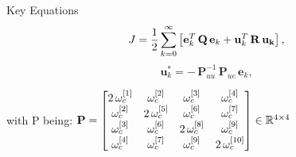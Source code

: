 \documentclass{beamer}
\begin{document}
\begin{frame}{Key Equations}
\begin{equation}
  J =  \frac{1}{2} \sum_{k=0}^\infty\left[{\bf e}_k^T \, {\bf Q} \, {\bf e}_k + {\bf u}_k^T \, {\bf R} \, {\bf u_k}\right],
\end{equation}
\begin{equation}
 \mathbf{u}_k^* = -\,  \mathbf{P}_{uu}^{-1}\, \mathbf{P}_{ue}\, \mathbf{e}_k,
\end{equation}
\begin{center}
with P being:
 ${\bf P}=\begin{bmatrix} 
 2\,\omega_c^{[1]}    & \omega_c^{[2]}      & \omega_c^{[3]}       & \omega_c^{[4]}        \\ 
 \omega_c^{[2]}       &2\, \omega_c^{[5]}   & \omega_c^{[6]}       & \omega_c^{[7]}        \\
 \omega_c^{[3]}       & \omega_c^{[6]}      &2\, \omega_c^{[8]}   & \omega_c^{[9]}   \\   
 \omega_c^{[4]}       & \omega_c^{[7]}      & \omega_c^{[9]}      & 2\,\omega_c^{[10]}      
 \end{bmatrix}\in \mathbb{R}^{4\times 4}$
 \end{center}
\end{frame}
\end{document}
